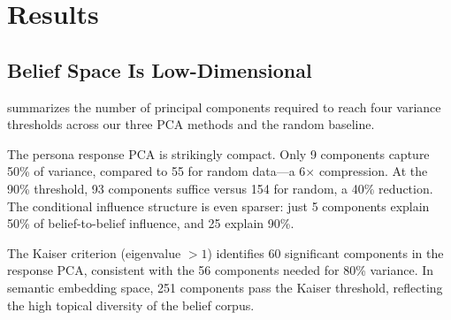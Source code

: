\section{Results}
\label{sec:results}

\subsection{Belief Space Is Low-Dimensional}

 summarizes the number of principal components required to reach four variance thresholds across our three PCA methods and the random baseline.

\begin{table}[t]
\centering
\caption{Number of principal components needed to explain a given fraction of total variance. Persona response PCA requires 40\% fewer components than the random baseline at the 90\% threshold. Conditional influence PCA is even more compressed: 25 components suffice for 90\%.}
\label{tab:variance}
\vspace{4pt}
\end{table}

The persona response PCA is strikingly compact. Only 9 components capture 50\% of variance, compared to 55 for random data---a 6$\times$ compression. At the 90\% threshold, 93 components suffice versus 154 for random, a 40\% reduction. The conditional influence structure is even sparser: just 5 components explain 50\% of belief-to-belief influence, and 25 explain 90\%.

The Kaiser criterion (eigenvalue $> 1$) identifies 60 significant components in the response PCA, consistent with the 56 components needed for 80\% variance. In semantic embedding space, 251 components pass the Kaiser threshold, reflecting the high topical diversity of the belief corpus.

